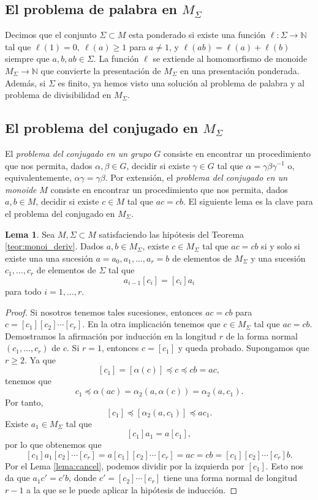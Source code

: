 \documentclass[12pt]{book}
\theoremstyle{definition}
\newtheorem{lema}{Lema}[section]
\begin{document}
\subsection{El problema de palabra en $M_\Sigma$}

Decimos que el conjunto $\Sigma\subset M$ esta ponderado si existe una función $\ell:\Sigma\rightarrow\mathbb{N}$ tal que $\ell(1)=0,\ \ell(a)\geq 1$ para $a\neq 1$, y $\ell(ab)=\ell(a)+\ell(b)$ siempre que $a,b,ab\in\Sigma$. La función $\ell$ se extiende al homomorfismo de monoide $M_\Sigma\rightarrow\mathbb{N}$ que convierte la presentación de $M_\Sigma$ en una presentación ponderada. Además, si $\Sigma$ es finito, ya hemos visto una solución al problema de palabra y al problema de divisibilidad en $M_\Sigma$.

\subsection{El problema del conjugado en $M_\Sigma$}
\label{sec:pc_msigma}
El \textit{problema del conjugado en un grupo} $G$ consiste en encontrar un procedimiento que nos permita, dados $\alpha,\beta\in G$, decidir si existe $\gamma\in G$ tal que $\alpha=\gamma\beta\gamma^{-1}$ o, equivalentemente, $\alpha\gamma=\gamma\beta$. Por extensión, el \textit{problema del conjugado en un monoide} $M$ consiste en encontrar un procedimiento que nos permita, dados $a,b\in M$, decidir si existe $c\in M$ tal que $ac=cb$. El siguiente lema es la clave para el problema del conjugado en $M_\Sigma$.

\begin{lema}
Sea $M,\Sigma\subset M$ satisfaciendo las hipótesis del Teorema \ref{teor:monoi_deriv}. Dados $a,b\in M_\Sigma$, existe $c\in M_\Sigma$ tal que $ac=cb$ si y solo si existe una una sucesión $a=a_0,a_1,\ldots,a_r=b$ de elementos de $M_\Sigma$ y una sucesión $c_1,\ldots,c_r$ de elementos de $\Sigma$ tal que
$$a_{i-1}[c_i]=[c_i]a_i$$
para todo $i=1,\ldots,r$.

\label{lema:conjugado}
\end{lema}

\begin{proof} Si nosotros tenemos tales sucesiones, entonces $ac=cb$ para $c=[c_1][c_2]\cdots[c_r]$. En la otra implicación tenemos que $c\in M_\Sigma$ tal que $ac=cb$. Demostramos la afirmación por inducción en la longitud $r$ de la forma normal $(c_1,\ldots,c_r)$ de $c$. Si $r=1$, entonces $c = [c_1]$ y queda probado. Supongamos que $r\geq 2$. Ya que
$$[c_1]=[\alpha(c)]\preceq c \preceq cb = ac,$$
tenemos que
$$c_1\preceq\alpha(ac)=\alpha_2(a,\alpha(c))=\alpha_2(a,c_1).$$
Por tanto,
$$[c_1]\preceq [\alpha_2(a,c_1)]\preceq ac_1.$$
Existe $a_1\in M_\Sigma$ tal que
$$[c_1]a_1=a[c_1],$$
por lo que obtenemos que 
$$[c_1]a_1[c_2]\cdots[c_r]=a[c_1][c_2]\cdots[c_r]=ac=cb=[c_1][c_2]\cdots[c_r]b.$$
Por el Lema \ref{lema:cancel}, podemos dividir por la izquierda por $[c_1]$. Esto nos da que $a_1c'=c'b$, donde $c'=[c_2]\cdots[c_r]$ tiene una forma normal de longitud $r-1$ a la que se le puede aplicar la hipótesis de inducción.
\end{proof}
\end{document}

